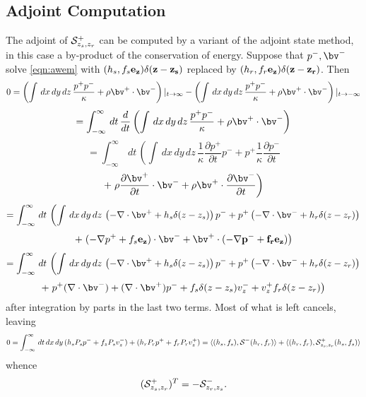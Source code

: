 \subsection{Adjoint Computation}
The adjoint of ${\cal S}^+_{z_s,z_r}$ can be computed by a variant of
the adjoint state method, in this case a by-product of the
conservation of energy. Suppose that $p^-,\bv^-$ solve \ref{eqn:awem}
with $(h_s,f_s\bf{e}_z)\delta(z-z_s)$ replaced by
$ (h_r,f_r\bf{e}_z) \delta(z-z_r)$. Then
\[
0 = 
\left(\int\, dx\,dy\,dz\, \frac{p^+ p^-}{\kappa} +  
\rho \bv^+ \cdot \bv^- \right)|_{t \rightarrow \infty}
-
\left(\int\, dx\,dy\,dz\, \frac{p^+ p^-}{\kappa} +  \rho \bv^+ \cdot \bv^- \right)|_{t \rightarrow -\infty}
\]
\[
= 
\int_{-\infty}^{\infty} \,dt\, \frac{d}{dt}\left(\int\, dx\,dy\,dz\, \frac{p^+ p^-}{\kappa} +  \rho \bv^+ \cdot \bv^- \right)
\]
\[
= 
\int_{-\infty}^{\infty} \,dt\, \left(\int\, dx\,dy\,dz\, \frac{1}{\kappa} \frac{\partial p^+}{\partial t} p^- +  p^+ \frac{1}{\kappa}\frac{\partial p^-}{\partial t} \right.
\]
\[
+
\left. \rho \frac{\partial \bv^+}{\partial t} \cdot \bv^- + \rho \bv^+ \cdot \frac{\partial \bv^-}{\partial t} \right)
\]
\[
= 
\int_{-\infty}^{\infty} \,dt\, \left(\int\, dx\,dy\,dz\, \left(- \nabla \cdot \bv^+ + 
 h_s \delta(z-z_s)\right) p^- + p^+ \left(- \nabla \cdot \bv^- + 
 h_r \delta(z-z_r)\right) \right.
\]
\[
+
\left.  (- \nabla p^++f_s\bf{e}_z) \cdot \bv^- + \bv^+ \cdot (-\nabla
  p^- + f_r \bf{e_z}) \right)
\]
\[
= 
\int_{-\infty}^{\infty}\,dt\, \left(\int\, dx\,dy\,dz\, \left(- \nabla \cdot \bv^+ + 
 h_s \delta(z-z_s)\right) p^- + p^+ \left(- \nabla \cdot \bv^- + 
 h_r \delta(z-z_r)\right) \right.
\]
\[
+
\left.  p^+ (\nabla \cdot \bv^-) + (\nabla \cdot \bv^+) p^- 
  +f_s \delta(z-z_s) v_z^- + v_z^+f_r \delta(z-z_r) \right)
\]
after integration by parts in the last two terms. Most of what is left cancels, leaving 
\[
0 = \int_{-\infty}^{\infty}\,dt\,dx\,dy\, (h_sP_sp^-+f_zP_sv_z^-) +
( h_rP_rp^++f_rP_rv_z^+) = \langle (h_s,f_s), {\cal S}^-(h_r,f_r) \rangle+ \langle (h_r,f_r), {\cal S}^+_{z_s,z_r}(h_s,f_s) \rangle
\]
whence
\begin{equation}
\label{eqn:sadj}
 ({\cal S}^+_{z_s,z_r})^T = -{\cal S}^{-}_{z_r,z_s}.
\end{equation}

